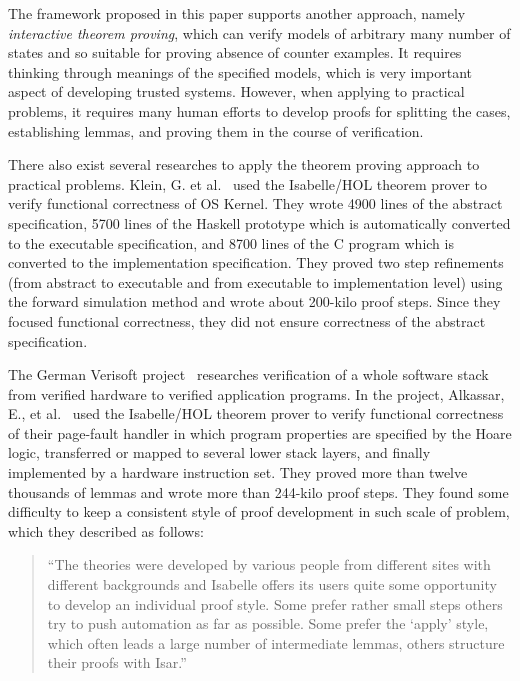 \documentclass[12pt]{report}
\begin{document}
The framework proposed in this paper supports another approach, namely
{\it interactive theorem proving}, which can verify models of
arbitrary many number of states and so suitable for proving absence of
counter examples. It requires thinking through meanings of the
specified models, which is very important aspect of developing trusted
systems. However, when applying to practical problems, it requires
many human efforts to develop proofs for splitting the cases,
establishing lemmas, and proving them in the course of verification.

There also exist several researches to apply the theorem proving
approach to practical problems. Klein, G. et
al.~\cite{KleinEHACDEEKNSTW09} used the Isabelle/HOL theorem
prover to verify functional correctness of OS Kernel. They wrote 4900
lines of the abstract specification, 5700 lines of the Haskell
prototype which is automatically converted to the executable
specification, and 8700 lines of the C program which is converted to
the implementation specification. They proved two step refinements
(from abstract to executable and from executable to implementation
level) using the forward simulation method and wrote about 200-kilo
proof steps. Since they focused functional correctness, they did not
ensure correctness of the abstract specification.

The German Verisoft project~\cite{Verisoft} researches verification of
a whole software stack from verified hardware to verified application
programs. In the project, Alkassar, E., et
al.~\cite{Alkassar:JAR-42-2-38} used the Isabelle/HOL theorem prover
to verify functional correctness of their page-fault handler in which
program properties are specified by the Hoare logic, transferred or
mapped to several lower stack layers, and finally implemented by a
hardware instruction set. They proved more than twelve thousands of
lemmas and wrote more than 244-kilo proof steps. They found some
difficulty to keep a consistent style of proof development in such
scale of problem, which they described as follows:
\vspace{-0.3cm}
\begin{quotation}
``The theories were developed by various people from different sites
with different backgrounds and Isabelle offers its users quite some
opportunity to develop an individual proof style. Some prefer rather
small steps others try to push automation as far as possible. Some
prefer the ‘apply’ style, which often leads a large number of
intermediate lemmas, others structure their proofs with Isar.''
\end{quotation}
\end{document}
